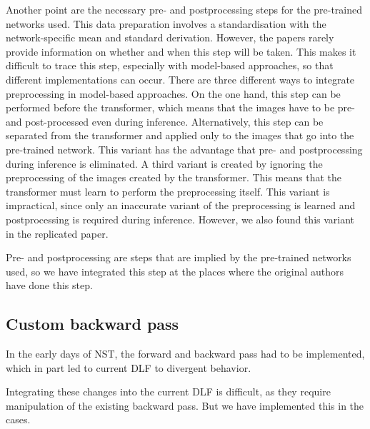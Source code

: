 Another point are the necessary pre- and postprocessing steps for the pre-trained networks used. This data preparation involves a standardisation with the network-specific mean and standard derivation. However, the papers rarely provide information on whether and when this step will be taken. This makes it difficult to trace this step, especially with model-based approaches, so that different implementations can occur. There are three different ways to integrate preprocessing in model-based approaches. On the one hand, this step can be performed before the transformer, which means that the images have to be pre- and post-processed even during inference. Alternatively, this step can be separated from the transformer and applied only to the images that go into the pre-trained network. This variant has the advantage that pre- and postprocessing during inference is eliminated. A third variant is created by ignoring the preprocessing of the images created by the transformer. This means that the transformer must learn to perform the preprocessing itself. This variant is impractical, since only an inaccurate variant of the preprocessing is learned and postprocessing is required during inference. However, we also found this variant in the replicated paper.

Pre- and postprocessing are steps that are implied by the pre-trained networks used, so we have integrated this step at the places where the original authors have done this step.

\subsection{Custom backward pass}

In the early days of NST, the forward and backward pass had to be implemented, which in part led to current DLF to divergent behavior.

Integrating these changes into the current DLF is difficult, as they require manipulation of the existing backward pass. But we have implemented this in the cases.

